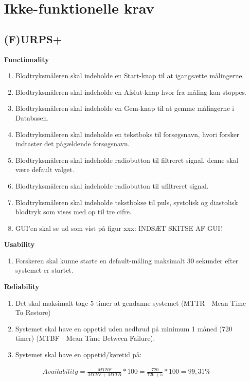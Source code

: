 \section{Ikke-funktionelle krav}


\subsection{(F)URPS+}

\textbf{Functionality}
\begin{enumerate}
\item Blodtryksmåleren skal indeholde en Start-knap til at igangsætte målingerne. 
\item Blodtryksmåleren skal indeholde en Afslut-knap hvor fra måling kan stoppes.
\item Blodtryksmåleren skal indeholde en Gem-knap til at gemme målingerne i Databasen.
\item Blodtryksmåleren skal indeholde en tekstboks til forsøgsnavn, hvori forsker indtaster det pågældende forsøgsnavn.
\item Blodtryksmåleren skal indeholde radiobutton til filtreret signal, denne skal være default valget.
\item Blodtryksmåleren skal indeholde radiobutton til ufiltreret signal.
\item Blodtryksmåleren skal indeholde tekstbokse til puls, systolisk og diastolisk blodtryk som vises med op til tre cifre.
\item GUI’en skal se ud som vist på figur xxx:    INDSÆT SKITSE AF GUI!
\end{enumerate}

\textbf{Usability}
\begin{enumerate}
\item Forskeren skal kunne starte en default-måling maksimalt 30 sekunder efter systemet er startet.
\end{enumerate}

\textbf{Reliability}
\begin{enumerate}
\item Det skal maksimalt tage 5 timer at gendanne systemet (MTTR - Mean Time To Restore)
\item Systemet skal have en oppetid uden nedbrud på minimum 1 måned (720 timer) (MTBF - Mean Time Between Failure).   
\item Systemet skal have en oppetid/køretid på: 
\end{enumerate}

				\begin{align}
					Availability = \frac{MTBF}{MTBF+MTTR}*100 = \frac{720}{720+5}*100 = 99,31 \%
				\end{align}



